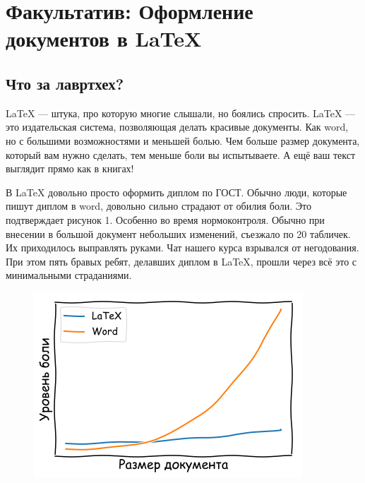 \documentclass[12pt, a4paper, oneside]{article}
\begin{document}
	
\section*{Факультатив: Оформление документов в \LaTeX} 


\subsection*{Что за лавртхех?}

\LaTeX{ } ---  штука, про которую многие слышали, но боялись спросить.  \LaTeX{ } --- это издательская система, позволяющая делать красивые документы. Как word, но с большими возможностями и меньшей болью. Чем больше размер документа, который вам нужно сделать, тем меньше боли вы испытываете. А ещё ваш текст выглядит прямо как в книгах! 

В \LaTeX{ } довольно просто оформить диплом по ГОСТ.  Обычно люди, которые пишут диплом в word, довольно сильно страдают от обилия боли. Это подтверждает рисунок 1. Особенно во время нормоконтроля. Обычно при внесении в большой документ небольших изменений, съезжало по 20 табличек. Их приходилось выправлять руками.  Чат нашего курса взрывался от негодования. При этом пять бравых ребят, делавших диплом в \LaTeX{}, прошли через всё это с минимальными страданиями. 


\begin{figure}[H]
	\begin{center}
		\includegraphics[scale=0.8]{latex.png}\label{pic:1}
	\end{center}
\end{figure}
\end{document}
